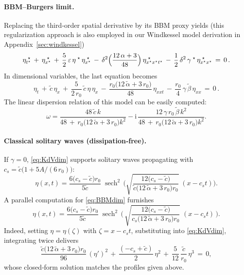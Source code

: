 \documentclass[alpha-refs, 12pt]{wiley-article}
\DeclareMathOperator{\sech}{sech}
\newcommand{\ui}{\mathrm{i}}
\newcommand{\eps}{\varepsilon}
\begin{document}
\paragraph{BBM--Burgers limit.} Replacing the third‐order spatial derivative by its BBM proxy yields (this regularization approach is also employed in our Windkessel model derivation in Appendix~\ref{sec:windkessel})
\begin{equation}\label{eq:5.11}
  \eta^{\;\star}_{t^{\star}}\,+\,\eta^{\;\star}_{x^{\star}}
  \,+\,\frac{5}{2}\,\eps\,\eta^{\;\star}\,\eta^{\;\star}_{x^{\star}}
  \,-\,\delta^{2}\Bigl(\frac{12\,\alpha+3}{48}\Bigr)\,\eta^{\;\star}_{x^{\star}x^{\star}t^{\star}}
  \,-\,\frac{1}{2}\,\delta^{2}\,\gamma^{\;\star}\,\eta^{\;\star}_{x^{\star}x^{\star}}\,=\,0\,.
\end{equation}
In dimensional variables, the last equation becomes
\begin{equation}\label{eq:BBMdim}
  \eta_{t}\,+\,\tilde{c}\,\eta_{x}
  \,+\,\frac{5}{2\,r_{0}}\,\tilde{c}\,\eta\,\eta_{x}
  \,-\,\frac{r_{0}\bigl(12\,\tilde{\alpha}+3\,r_{0}\bigr)}{48}\,\eta_{xxt}
  \,-\,\frac{r_{0}}{4}\,\gamma\,\tilde{\beta}\,\eta_{xx}\,=\,0\,.
\end{equation}
The linear dispersion relation of this model can be easily computed:
\begin{equation}
  \omega=\frac{48\,\tilde{c}\,k}{48\,+\,r_{0}\bigl(12\,\tilde{\alpha}+3\,r_{0}\bigr)k^{2}}
        -\ui\,\frac{12\,\gamma\,r_{0}\,\tilde{\beta}\,k^{2}}
                 {48\,+\,r_{0}\bigl(12\,\tilde{\alpha}+3\,r_{0}\bigr)k^{2}}.
\end{equation}

\paragraph{Classical solitary waves (dissipation‐free).} If $\gamma=0$, \cref{eq:KdVdim} supports solitary waves propagating with $c_{s} = \tilde{c}\bigl(1+5A/(6\,r_{0})\bigr)$:
\begin{equation*}
  \eta(x,t)=\frac{6\bigl(c_{s}-\tilde{c}\bigr)r_{0}}{5\tilde{c}}\;
  \sech^{2}\,\biggl(\sqrt{\frac{12\bigl(c_{s}-\tilde{c}\bigr)}{\tilde{c}\bigl(12\,\tilde{\alpha}+3\,r_{0}\bigr)r_{0}}}\;(x-c_{s}t)\biggr).
\end{equation*}
A parallel computation for \cref{eq:BBMdim} furnishes
\begin{equation*}
  \eta(x,t)=\frac{6\bigl(c_{s}-\tilde{c}\bigr)r_{0}}{5\tilde{c}}\;
  \sech^{2}\,\biggl(\,\sqrt{\frac{12\bigl(c_{s}-\tilde{c}\bigr)}{c_{s}\bigl(12\,\tilde{\alpha}+3\,r_{0}\bigr)r_{0}}}\;(x-c_{s}t)\,\biggr).
\end{equation*}
Indeed, setting $\eta=\eta(\zeta)$ with $\zeta=x-c_{s}t$, substituting into \cref{eq:KdVdim},
integrating twice delivers
\begin{equation*}
  \frac{\tilde{c}\bigl(12\,\tilde{\alpha}+3\,r_{0}\bigr)r_{0}}{96}\,(\eta')^{2}
  \,+\,\frac{(-c_{s}+\tilde{c})}{2}\,\eta^{2}
  \,+\,\frac{5}{12}\,\frac{\tilde{c}}{r_{0}}\,\eta^{3}\,=\,0,
\end{equation*}
whose closed‐form solution matches the profiles given above.
\end{document}
